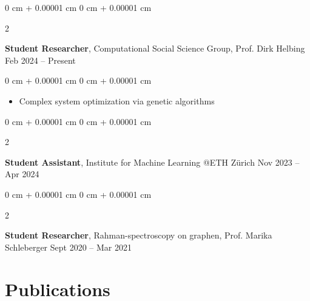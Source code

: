 \documentclass[10pt, letterpaper]{article}
\newenvironment{highlights}{
    \begin{itemize}[
        topsep=0.10 cm,
        parsep=0.10 cm,
        partopsep=0pt,
        itemsep=0pt,
        leftmargin=0 cm + 10pt
    ]
}{
    \end{itemize}
} %
\newenvironment{onecolentry}{
    \begin{adjustwidth}{
        0 cm + 0.00001 cm
    }{
        0 cm + 0.00001 cm
    }
}{
    \end{adjustwidth}
} %
\newenvironment{twocolentry}[2][]{
    \onecolentry
    \def\secondColumn{#2}
    \setcolumnwidth{\fill, 4.5 cm}
    \begin{paracol}{2}
}{
    \switchcolumn \raggedleft \secondColumn
    \end{paracol}
    \endonecolentry
} %
\begin{document}



        
        \begin{twocolentry}{
            Feb 2024 – Present
        }
            \textbf{Student Researcher}, Computational Social Science Group, Prof. Dirk Helbing\end{twocolentry}

        \vspace{0.10 cm}
        \begin{onecolentry}
            \begin{highlights}
                \item Complex system optimization via genetic algorithms

            \end{highlights}
        \end{onecolentry}

        \vspace{0.2 cm}

        \begin{twocolentry}{
            Nov 2023 – Apr 2024
        }
            \textbf{Student Assistant}, Institute for Machine Learning @ETH Zürich\end{twocolentry}

        \vspace{0.2 cm}



        


        \begin{twocolentry}{
            Sept 2020 – Mar 2021
        }
            \textbf{Student Researcher}, Rahman-spectroscopy on graphen, Prof. Marika Schleberger \end{twocolentry}

   
        \vspace{0.2 cm}

      

\section{Publications}
\end{document}
